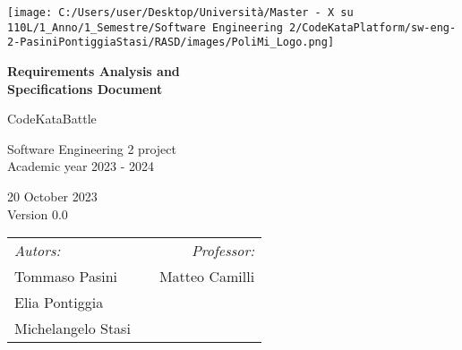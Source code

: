 
\begin{titlepage}
    \begin{center}
        \texttt{[image: C:/Users/user/Desktop/Università/Master - X su 110L/1\_Anno/1\_Semestre/Software Engineering 2/CodeKataPlatform/sw-eng-2-PasiniPontiggiaStasi/RASD/images/PoliMi\_Logo.png]}

        \vspace*{1cm}
            \textbf{\huge Requirements Analysis and\\Specifications Document}
 
        \vspace{0.5cm}
            \LARGE CodeKataBattle
             
        \vspace{1.5cm}
            \normalsize Software Engineering 2 project\\
            Academic year 2023 - 2024

        \vspace{0.5cm}
            20 October 2023\\
            Version 0.0
 
        \vspace{1.5cm}
            \small
            \begin{table}[b]
                \begin{tabular}{l p{5.5cm} l}
                    \textit{Autors:}    & & \multicolumn{1}{r}{\textit{Professor:}}           \\
                    Tommaso Pasini      & & \multicolumn{1}{r}{Matteo Camilli}                \\
                    Elia Pontiggia      & & \textbf{}                                         \\
                    Michelangelo Stasi  & & \textbf{}                              
                \end{tabular}
            \end{table}
              
    \end{center}
 \end{titlepage}
